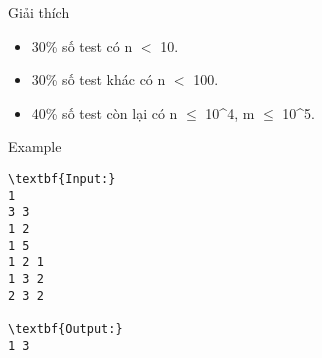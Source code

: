 Giải thích
\begin{itemize}
	\item 30\% số test có n $<$ 10.
	\item 30\% số test khác có n $<$ 100.
	\item 40\% số test còn lại có n  $\le$  10^4, m  $\le$  10^5.
\end{itemize}
Example
\begin{verbatim}
\textbf{Input:}
1
3 3
1 2
1 5
1 2 1
1 3 2
2 3 2

\textbf{Output:}
1 3
\end{verbatim}